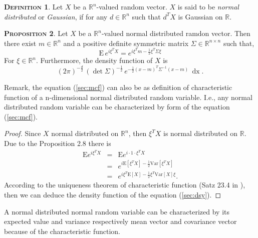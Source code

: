 \documentclass[a4paper, twoside, 11pt]{article}
\theoremstyle{definition}
\newtheorem{definition}{\scshape Definition}[section]
\newtheorem{proposition}[definition]{\scshape Proposition}
\newcommand{\sqbr}[1]{\left[ {#1} \right]}
\begin{document}
\begin{definition}
  Let $X$ be a $\mathbb{R}^{n}$-valued random vector. $X$ is said to be \emph{normal distributed} or \emph{Gaussian}, if for any $d \in \mathbb{R}^{n}$ such that $d^TX$ is Gaussian on $\mathbb{R}$.
\end{definition}
\begin{proposition}
  Let $X$ be a $\mathbb{R}^{n}$-valued normal distributed ramdon vector. Then there exist $m \in \mathbb{R}^{n}$ and a positive definite symmetric matrix $\Sigma \in \mathbb{R}^{n\times n}$ such that,
  \begin{equation}
	\mathrm{E}\,e^{i\xi^TX} = e^{i\xi^Tm - \frac{1}{2}\xi^T \Sigma \xi}
	\label{sec:mcf}
  \end{equation}
  For $\xi \in \mathbb{R}^{n}$. Furthermore, the density function of $X$ is
\begin{equation}
  (2\pi)^{-\frac{d}{2}}\, (\det\Sigma) ^{-\frac{1}{2}}\,e^{-\frac{1}{2}(x-m)^T\Sigma^{-1}(x-m)}\,\mathop{dx}.
  \label{sec:dsy}
\end{equation}
\end{proposition}

Remark, the equation (\ref{sec:mcf}) can also be as definition of characteristic function of a n-dimensional normal distributed random variable. I.e., any normal distributed random variable can be characterized by form of the equation (\ref{sec:mcf}).

\begin{proof}
  Since $X$ normal distributed on $\mathbb{R}^{n}$, then $\xi^T X$ is normal distributed on $\mathbb{R}$. Due to the Proposition 2.8 there is
  \begin{eqnarray*}
	\mathrm{E} e^{i\xi^T X} &=& \mathrm{E} e^{i\cdot 1 \cdot \xi^T X}\\
	                        &=& e^{i\mathrm{E}\sqbr{\xi^T X} -\frac{1}{2}\mathrm{Var}\sqbr{\xi^T X}}\\
							&=& e^{i\xi^T\mathrm{E}\sqbr{X} - \frac{1}{2}\xi^T \mathrm{Var}\sqbr{X} \xi}.
  \end{eqnarray*}
  According to the uniqueness theorem of characteristic function (Satz 23.4 in \cite{bauer}), then we can deduce the density function of the equation (\ref{sec:dsy}).
\end{proof}

A normal distributed normal random variable can be characterized by its expected value and variance respectively mean vector and covariance vector because of the characteristic function.
\end{document}
